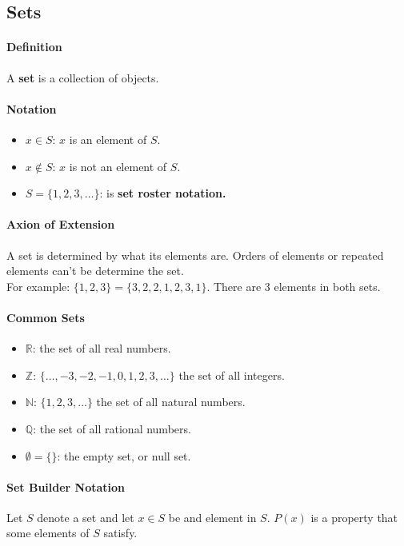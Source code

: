 \subsection{Sets}
\paragraph*{Definition} 
A \textbf{set} is a collection of objects.

\paragraph*{Notation} 
\begin{itemize}
    \item $x \in S$: $x$ is an element of $S$.
    \item $x \notin S$: $x$ is not an element of $S$.
    \item $S = \{1,2,3, \dots\}$: is \textbf{set roster notation.}
\end{itemize}

\paragraph*{Axion of Extension}
A set is determined by what its elements are. Orders of elements or repeated elements can't be determine the set.\\
For example: $\{1,2,3\} = \{3,2,2,1,2,3,1\}$. There are 3 elements in both sets.

\paragraph*{Common Sets}
\begin{itemize}
    \item $\mathbb{R}$: the set of all real numbers.
    \item $\mathbb{Z}$: $\{\dots , -3,-2,-1,0,1,2,3,\dots\}$ the set of all integers.
    \item $\mathbb{N}$: $\{1,2,3,\dots\}$ the set of all natural numbers.
    \item $\mathbb{Q}$: the set of all rational numbers.
    \item $\emptyset = \{\}$: the empty set, or null set.
\end{itemize}

\paragraph*{Set Builder Notation}
Let $S$ denote a set and let $x\in S$ be and element in $S$. $P(x)$ is a property that some elements of $S$ satisfy.

